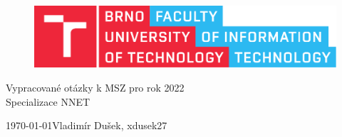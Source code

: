 \documentclass{fitthesis}
\begin{document}
\begin{titlepage}
    \begin{center}


        \begin{figure}[htb]
            \centering
            \includegraphics[width=0.85\hsize]{fitlogo.pdf}
        \end{figure}


        {\Huge Vypracované otázky k MSZ pro rok 2022} \\
        \bigskip
        \bigskip
        {\LARGE Specializace NNET}

    \end{center}

    {\Large \today \hfill Vladimír Dušek, xdusek27}

\end{titlepage}





\tableofcontents
\newpage



\newpage


\newpage


\newpage


\newpage


\newpage


\newpage


\newpage


\newpage


\newpage


\newpage

\end{document}

